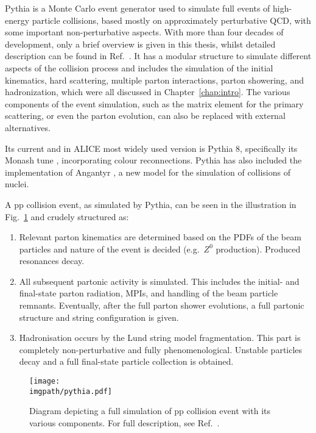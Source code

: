 Pythia is a Monte Carlo event generator used to simulate full events of high-energy particle collisions, based mostly on approximately perturbative QCD, with some important non-perturbative aspects. With more than four decades of development, only a brief overview is given in this thesis, whilst detailed description can be found in Ref.~\cite{bierlichComprehensiveGuidePhysics2022, sjostrandPYTHIAEventGenerator2020}. It has a modular structure to simulate different aspects of the collision process and includes the simulation of the initial kinematics, hard scattering, multiple parton interactions, parton showering, and hadronization, which were all discussed in Chapter~\ref{chap:intro}. The various components of the event simulation, such as the matrix element for the primary scattering, or even the parton evolution, can also be replaced with external alternatives. 

Its current and in ALICE most widely used version is Pythia 8, specifically its Monash tune \cite{skandsTuningPYTHIAMonash2014}, incorporating colour reconnections. Pythia has also included the implementation of Angantyr \cite{bierlichAngantyrModelHeavyIon2018}, a new model for the simulation of collisions of nuclei.

A pp collision event, as simulated by Pythia, can be seen in the illustration in Fig.~\ref{fig:colls:pythia} and crudely structured as:
\begin{enumerate}
\item Relevant parton kinematics are determined based on the PDFs of the beam particles and nature of the event is decided (e.g.\ $Z^0$ production). Produced resonances decay.
\item All subsequent partonic activity is simulated. This includes the initial- and final-state parton radiation, MPIs, and handling of the beam particle remnants. Eventually, after the full parton shower evolutions, a full partonic structure and string configuration is given.
\item Hadronisation occurs by the Lund string model fragmentation. This part is completely non-perturbative and fully phenomenological. Unstable particles decay and a full final-state particle collection is obtained. \cite{sjostrandBriefIntroductionPYTHIA2008}
\end{enumerate}

\begin{figure}[H]
\texttt{[image: \\imgpath/pythia.pdf]}
\caption{Diagram depicting a full simulation of pp collision event with its various components. For full description, see Ref.~\cite{bierlichComprehensiveGuidePhysics2022}.}
\label{fig:colls:pythia}
\end{figure}

